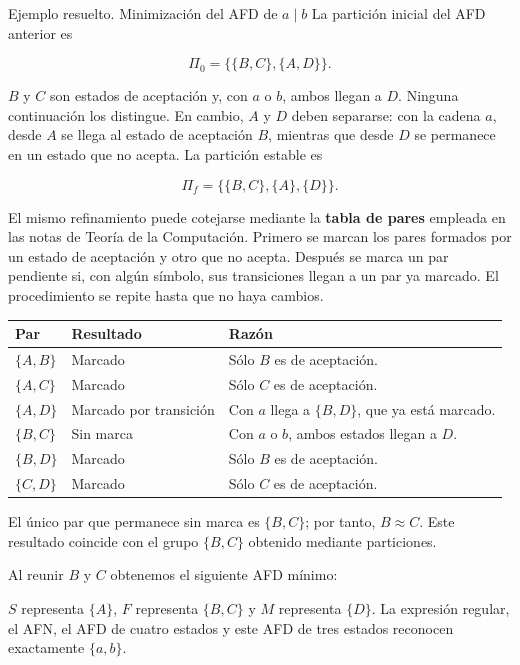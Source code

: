 \documentclass[11pt,spanish]{article}
\providecommand{\tabularnewline}{\\}
\begin{document}
\begin{ejemplo}{Ejemplo resuelto. Minimización del AFD de \(a\mid b\)}
La partición inicial del AFD anterior es

\[
\Pi_0=\big\{\{B,C\},\{A,D\}\big\}.
\]

\(B\) y \(C\) son estados de aceptación y, con \(a\) o \(b\), ambos llegan a \(D\). Ninguna continuación los distingue. En cambio, \(A\) y \(D\) deben separarse: con la cadena \(a\), desde \(A\) se llega al estado de aceptación \(B\), mientras que desde \(D\) se permanece en un estado que no acepta. La partición estable es

\[
\Pi_f=\big\{\{B,C\},\{A\},\{D\}\big\}.
\]

El mismo refinamiento puede cotejarse mediante la \textbf{tabla de pares} empleada en las notas de Teoría de la Computación. Primero se marcan los pares formados por un estado de aceptación y otro que no acepta. Después se marca un par pendiente si, con algún símbolo, sus transiciones llegan a un par ya marcado. El procedimiento se repite hasta que no haya cambios.

\begin{center}
\small
\renewcommand{\arraystretch}{1.06}
\begin{tabular}{|p{}|p{}|p{}|}
\hline
\textbf{Par} & \textbf{Resultado} & \textbf{Razón} \tabularnewline
\hline
\(\{A,B\}\) & Marcado & Sólo \(B\) es de aceptación. \tabularnewline
\hline
\(\{A,C\}\) & Marcado & Sólo \(C\) es de aceptación. \tabularnewline
\hline
\(\{A,D\}\) & Marcado por transición & Con \(a\) llega a \(\{B,D\}\), que ya está marcado. \tabularnewline
\hline
\(\{B,C\}\) & Sin marca & Con \(a\) o \(b\), ambos estados llegan a \(D\). \tabularnewline
\hline
\(\{B,D\}\) & Marcado & Sólo \(B\) es de aceptación. \tabularnewline
\hline
\(\{C,D\}\) & Marcado & Sólo \(C\) es de aceptación. \tabularnewline
\hline
\end{tabular}
\end{center}

El único par que permanece sin marca es \(\{B,C\}\); por tanto, \(B\approx C\). Este resultado coincide con el grupo \(\{B,C\}\) obtenido mediante particiones.

Al reunir \(B\) y \(C\) obtenemos el siguiente AFD mínimo:

\begin{center}
\end{center}

\(S\) representa \(\{A\}\), \(F\) representa \(\{B,C\}\) y \(M\) representa \(\{D\}\). La expresión regular, el AFN, el AFD de cuatro estados y este AFD de tres estados reconocen exactamente \(\{a,b\}\).
\end{ejemplo}
\end{document}

